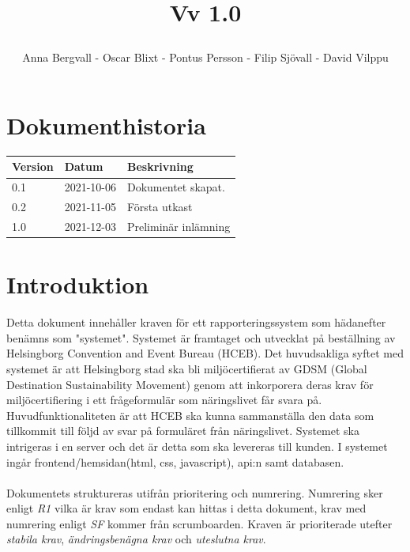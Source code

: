 \documentclass{article}
\date {#1}
\title {
    \documentNumber {01}    

    \documentTitle {Helsingborg Event and Convention Bureau}
    
    \documentDate {2021-08-20}
    \documentVersion Vv 1.0
    
    \author{Anna Bergvall - Oscar Blixt - Pontus Persson - Filip Sjövall - David Vilppu}
}
\begin{document}
\maketitle

\thispagestyle{empty}



\newpage

\tableofcontents


\newpage

\section{Dokumenthistoria}
\begin{tabular}{ l | l | l }
    Version & Datum & Beskrivning \\
    \hline
    0.1 & 2021-10-06 & Dokumentet skapat. \\
    0.2 & 2021-11-05 & Första utkast\\
    1.0 & 2021-12-03 & Preliminär inlämning\\
    
\end{tabular}

\section{Introduktion}

    Detta dokument innehåller kraven för ett rapporteringssystem som hädanefter benämns som "systemet". Systemet är framtaget och utvecklat på beställning av Helsingborg Convention and Event Bureau (HCEB). Det huvudsakliga syftet med systemet är att Helsingborg stad ska bli miljöcertifierat av GDSM (Global Destination Sustainability Movement) genom att inkorporera deras krav för miljöcertifiering i ett frågeformulär som näringslivet får svara på. Huvudfunktionaliteten är att HCEB ska kunna sammanställa den data som tillkommit till följd av svar på formuläret från näringslivet. Systemet ska intrigeras i en server och det är detta som ska levereras till kunden. I systemet ingår frontend/hemsidan(html, css, javascript), api:n samt databasen. 
    \\\\
    Dokumentets struktureras utifrån prioritering och numrering. Numrering sker enligt \textit{R1} vilka är krav som endast kan hittas i detta dokument, krav med numrering enligt \textit{SF} kommer från scrumboarden. Kraven är prioriterade utefter \textit{stabila krav}, \textit{ändringsbenägna krav} och \textit{uteslutna krav}. 
    
\end{document}
